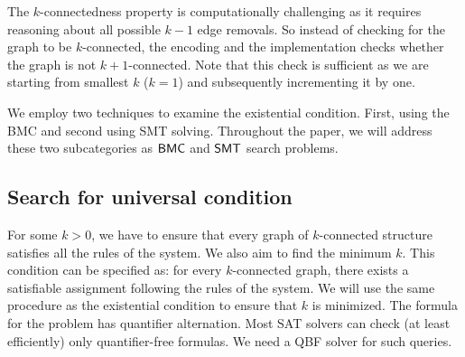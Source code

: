The $k$-connectedness property is computationally challenging as it requires reasoning about all possible $k - 1$ edge removals. 
%
So instead of checking for the graph to be $k$-connected, the encoding and the implementation checks whether the graph is not $k+1$-connected.
%
Note that this check is sufficient as we are starting from smallest $k$ ($k = 1$) and subsequently incrementing it by one.     

We employ two techniques to examine the existential condition. 
%
First, using the BMC and second using SMT solving.
%
Throughout the paper, we will address these two subcategories as $\mathsf{BMC}$ and $\mathsf{SMT}$ search problems.
%
%
%


\subsection{Search for universal condition}
%
For some $k>0$,
we have to ensure that every graph of $k$-connected structure satisfies all
the rules of the system.
%
We also aim to find the minimum $k$. 
%
This condition can be specified as: for every $k$-connected graph, there exists a satisfiable assignment following the rules of the system. 
%
%
We will use the same procedure as the existential condition to ensure that $k$ is minimized.
%
The formula for the problem has quantifier alternation. 
%
Most SAT solvers can check (at least efficiently) only quantifier-free formulas.
%
We need a QBF solver for such queries.
%

